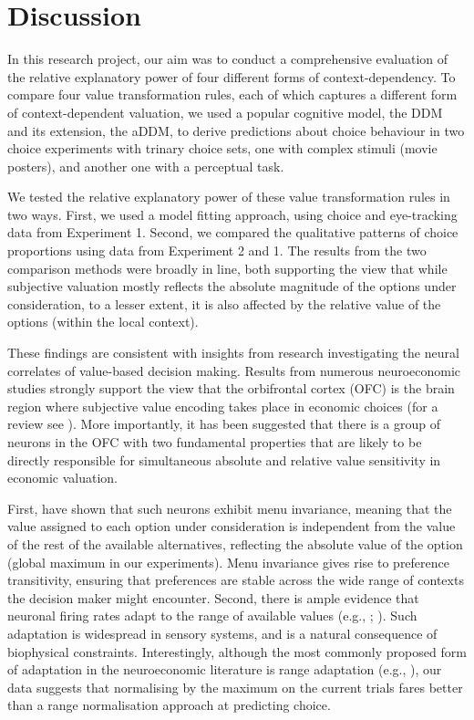 \documentclass[11pt,a4paper]{article}
\begin{document}
\newpage

\section{Discussion}

In this research project, our aim was to conduct a comprehensive evaluation of the relative explanatory power of four different forms of context-dependency. To compare four value transformation rules, each of which captures a different form of context-dependent valuation, we used a popular cognitive model, the DDM and its extension, the aDDM, to derive predictions about choice behaviour in two choice experiments with trinary choice sets, one with complex stimuli (movie posters), and another one with a perceptual task.

We tested the relative explanatory power of these value transformation rules in two ways. First, we used a model fitting approach, using choice and eye-tracking data from Experiment 1. Second, we compared the qualitative patterns of choice proportions using data from Experiment 2 and 1. The results from the two comparison methods were broadly in line, both supporting the view that while subjective valuation mostly reflects the absolute magnitude of the options under consideration, to a lesser extent, it is also affected by the relative value of the options (within the local context).

These findings are consistent with insights from research investigating the neural correlates of value-based decision making. Results from numerous neuroeconomic studies strongly support the view that the orbifrontal cortex (OFC) is the brain region where subjective value encoding takes place in economic choices (for a review see ). More importantly, it has been suggested that there is a group of neurons in the OFC with two fundamental properties that are likely to be directly responsible for simultaneous absolute and relative value sensitivity in economic valuation.

First,  have shown that such neurons exhibit menu invariance, meaning that the value assigned to each option under consideration is independent from the value of the rest of the available alternatives, reflecting the absolute value of the option (global maximum in our experiments). Menu invariance gives rise to preference transitivity, ensuring that preferences are stable across the wide range of contexts the decision maker might encounter. Second, there is ample evidence that neuronal firing rates adapt to the range of available values (e.g., ; ). Such adaptation is widespread in sensory systems, and is a natural consequence of biophysical constraints. Interestingly, although the most commonly proposed form of adaptation in the neuroeconomic literature is range adaptation (e.g., ), our data suggests that normalising by the maximum on the current trials fares better than a range normalisation approach at predicting choice.
\end{document}
